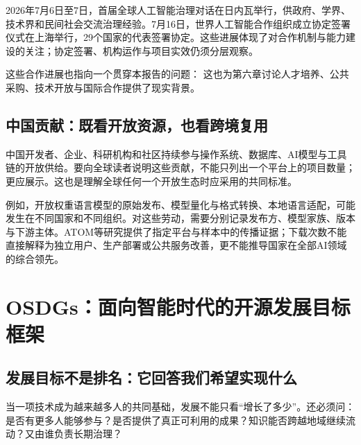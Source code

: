 \par\noindent\begingroup\setlength{\fboxsep}{8pt}\colorbox{bluegray}{\begin{minipage}{\dimexpr\linewidth-16pt\relax}\par\vspace{2pt}\par\vspace{2pt}
2026年7月6日至7日，首届全球人工智能治理对话在日内瓦举行，供政府、学界、技术界和民间社会交流治理经验。7月16日，世界人工智能合作组织成立协定签署仪式在上海举行，29个国家的代表签署协定。这些进展体现了对合作机制与能力建设的关注；协定签署、机构运作与项目实效仍须分层观察。\vspace{2pt}\end{minipage}}\endgroup\par\vspace{3pt}

这些合作进展也指向一个贯穿本报告的问题： 这也为第六章讨论人才培养、公共采购、技术开放与国际合作提供了现实背景。


\subsection{中国贡献：既看开放资源，也看跨境复用}
中国开发者、企业、科研机构和社区持续参与操作系统、数据库、AI模型与工具链的开放供给。要向全球读者说明这些贡献，不能只列出一个平台上的项目数量；更应展示。这也是理解全球任何一个开放生态时应采用的共同标准。

例如，开放权重语言模型的原始发布、模型量化与格式转换、本地语言适配，可能发生在不同国家和不同组织。对这些劳动，需要分别记录发布方、模型家族、版本与下游主体。ATOM等研究提供了指定平台与样本中的传播证据；下载次数不能直接解释为独立用户、生产部署或公共服务改善，更不能推导国家在全部AI领域的综合领先。

\section{OSDGs：面向智能时代的开源发展目标框架}\label{ch1-ch1sec2}
\subsection{发展目标不是排名：它回答我们希望实现什么}
当一项技术成为越来越多人的共同基础，发展不能只看“增长了多少”。还必须问：是否有更多人能够参与？是否提供了真正可利用的成果？知识能否跨越地域继续流动？又由谁负责长期治理？

